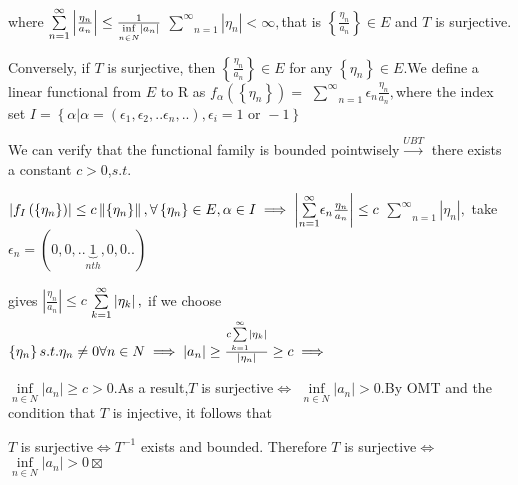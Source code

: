 \documentclass{article}
\begin{document}
where $\underset{n=1}{\overset{\infty }{\sum }}\left\vert \frac{\eta _{n}}{%
a_{n}}\right\vert \leq \frac{1}{\underset{n\in N}{\inf }\left\vert
a_{n}\right\vert }$ $\underset{n=1}{\overset{\infty }{\sum }}\left\vert \eta
_{n}\right\vert <\infty ,$that is $\left\{ \frac{\eta _{n}}{a_{n}}\right\}
\in E$ and $T$ is surjective.

Conversely, if $T$ is surjective, then $\left\{ \frac{\eta _{n}}{a_{n}}%
\right\} \in E$ for any $\left\{ \eta _{n}\right\} \in E.$We define a linear
functional from $E$ to R as $f_{\alpha }\left( \left\{ \eta _{n}\right\}
\right) =$ $\underset{n=1}{\overset{\infty }{\sum }}\epsilon _{n}\frac{\eta
_{n}}{a_{n}},$where the index set $I=\left\{ \alpha |\alpha =\left( \epsilon
_{1},\epsilon _{2},..\epsilon _{n},..\right) ,\epsilon _{i}=1\text{ or }%
-1\right\} $

We can verify that the functional family is bounded pointwisely$\overset{UBT}%
{\rightarrow }$ there exists a constant $c>0$,$s.t.$

$\left\vert f_{I}\left( \left\{ \eta _{n}\right\} \right) \right\vert \leq
c\left\Vert \left\{ \eta _{n}\right\} \right\Vert ,\forall \left\{ \eta
_{n}\right\} \in E,\alpha \in I\implies \left\vert \underset{n=1}{\overset{%
\infty }{\sum }}\epsilon _{n}\frac{\eta _{n}}{a_{n}}\right\vert \leq c$ $%
\underset{n=1}{\overset{\infty }{\sum }}\left\vert \eta _{n}\right\vert ,$%
take $\epsilon _{n}=\left( 0,0,..\underset{nth}{\underbrace{1}},0,0..\right) 
$

gives $\left\vert \frac{\eta _{n}}{a_{n}}\right\vert \leq c$ $\underset{k=1}{%
\overset{\infty }{\sum }}\left\vert \eta _{k}\right\vert ,$ if we choose $%
\left\{ \eta _{n}\right\} s.t.\eta _{n}\neq 0\forall n\in N\implies
\left\vert a_{n}\right\vert \geq \frac{c\underset{k=1}{\overset{\infty }{%
\sum }}\left\vert \eta _{k}\right\vert }{\left\vert \eta _{n}\right\vert }%
\geq c\implies $

$\underset{n\in N}{\inf }\left\vert a_{n}\right\vert \geq c>0.$As a result,$T
$ is surjective$\iff $ $\underset{n\in N}{\inf }\left\vert a_{n}\right\vert
>0.$By OMT and the condition that $T$ is injective, it follows that 

$T$ is surjective$\iff T^{-1}$ exists and bounded. Therefore $T$ is
surjective$\iff $ $\underset{n\in N}{\inf }\left\vert a_{n}\right\vert
>0\boxtimes $
\end{document}
